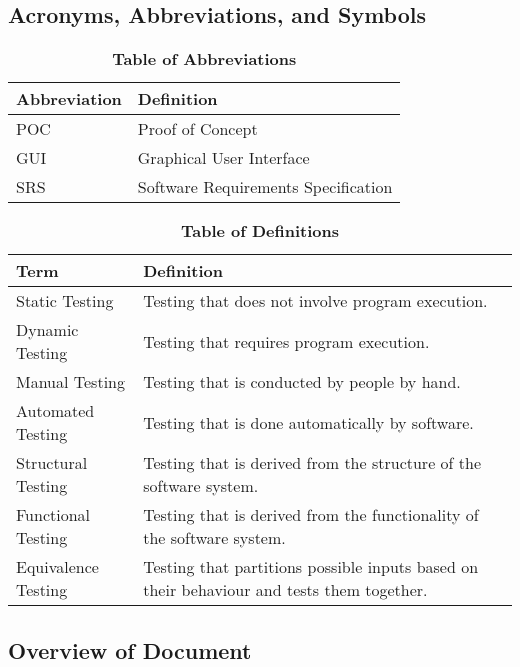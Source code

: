 \documentclass[12pt, titlepage]{article}
\begin{document}
\subsection{Acronyms, Abbreviations, and Symbols}
	
\begin{table}[hbp]
\caption{\textbf{Table of Abbreviations}} \label{Table}

\begin{tabularx}{\textwidth}{p{3cm}X}
\toprule
\textbf{Abbreviation} & \textbf{Definition} \\
\midrule
POC & Proof of Concept\\
GUI & Graphical User Interface\\
SRS & Software Requirements Specification\\
\bottomrule
\end{tabularx}

\end{table}

\begin{table}[!htbp]
\caption{\textbf{Table of Definitions}} \label{Table}

\begin{tabularx}{\textwidth}{p{4cm}X}
\toprule
\textbf{Term} & \textbf{Definition}\\
\midrule
Static Testing & Testing that does not involve program execution.\\
Dynamic Testing & Testing that requires program execution.\\
Manual Testing & Testing that is conducted by people by hand.\\
Automated Testing & Testing that is done automatically by software.\\
Structural Testing & Testing that is derived from the structure of the software system.\\
Functional Testing & Testing that is derived from the functionality of the software system.\\
Equivalence Testing & Testing that partitions possible inputs based on their behaviour and tests them together.\\
\bottomrule
\end{tabularx}

\end{table}	

\subsection{Overview of Document}
\end{document}
